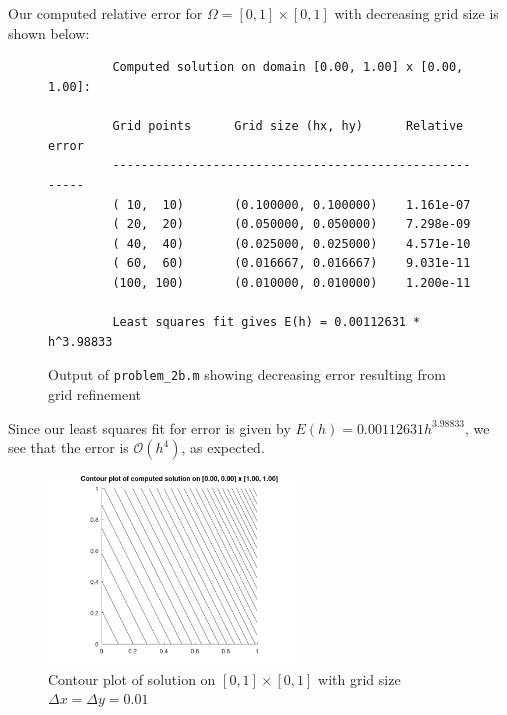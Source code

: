 \begin{solution}\ \\\\
    Our computed relative error for $\Omega = [0, 1] \times [0, 1]$ with decreasing grid size is shown below:

    \begin{figure}[h]
        \begin{lstlisting}
         Computed solution on domain [0.00, 1.00] x [0.00, 1.00]:

         Grid points      Grid size (hx, hy)      Relative error
         -------------------------------------------------------
         ( 10,  10)       (0.100000, 0.100000)    1.161e-07
         ( 20,  20)       (0.050000, 0.050000)    7.298e-09
         ( 40,  40)       (0.025000, 0.025000)    4.571e-10
         ( 60,  60)       (0.016667, 0.016667)    9.031e-11
         (100, 100)       (0.010000, 0.010000)    1.200e-11
         
         Least squares fit gives E(h) = 0.00112631 * h^3.98833
        \end{lstlisting}
        \caption{Output of \texttt{problem\_2b.m} showing decreasing error resulting from grid refinement}
    \end{figure}
    
    Since our least squares fit for error is given by $E(h) = 0.00112631 h^{3.98833}$, we see that the error is 
    $\mathcal{O}(h^4)$, as expected.
    
    \begin{figure}[h]
        \centering
        \includegraphics[width=0.6\textwidth]{poisson_9pt_stencil_0-0_1-1_hx-0.010_hy-0.010.png}
        \caption{Contour plot of solution on $[0, 1] \times [0, 1]$ with grid size $\Delta x =\Delta y = 0.01$}
    \end{figure}
\end{solution}